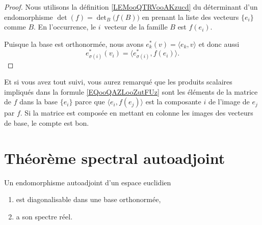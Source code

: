 \begin{proof}
	Nous utilisons la définition \ref{LEMooQTRVooAKzucd} du déterminant d'un endomorphisme \( \det(f)=\det_B\big( f(B) \big)\) en prenant la liste des vecteurs \( \{ e_i \}\) comme \( B\). En l'occurrence, le \( i\)\ieme\ vecteur de la famille \( B\) est \( f(e_i)\).

	Puisque la base est orthonormée, nous avons \( e^*_k(v)=\langle e_k, v\rangle \) et donc aussi
	\begin{equation}
		e^*_{\sigma(i)}(v_i)=\langle e_{\sigma(i)}^*, f(e_i)\rangle.
	\end{equation}
\end{proof}

Et si vous avez tout suivi, vous aurez remarqué que les produits scalaires impliqués dans la formule \eqref{EQooQAZLooZutFUz} sont les éléments de la matrice de \( f\) dans la base \( \{ e_i \}\) parce que \( \langle e_i, f(e_j)\rangle \) est la composante \( i\) de l'image de \( e_j\) par \( f\). Si la matrice est composée en mettant en colonne les images des vecteurs de base, le compte est bon.

\section{Théorème spectral autoadjoint}

\begin{theorem} \label{ThoRSBahHH}
	Un endomorphisme autoadjoint d'un espace euclidien
	\begin{enumerate}
		\item
		      est diagonalisable dans une base orthonormée,
		\item
		      a son spectre réel.
	\end{enumerate}
\end{theorem}

